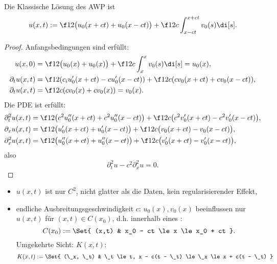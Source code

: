 \begin{st}[Existenz für AWP der Wellengl., D'Alembert'sche Formel, $d = 1$] \label{1.22}
	Die Klassische Lösung des AWP ist
	\[
		u(x,t) := \f 12 \big( u_0(x  + ct) + u_0(x-ct)\big) + \f 1{2c} \int_{x-ct}^{x+ct} v_0(s) \di[s].
	\]
	\begin{proof}
		Anfangsbedingungen sind erfüllt:
		\begin{align*}
			u(x,0) &= \f 12 \big(u_0(x) + u_0(x)\big) + \f 1{2c} \int_x^x v_0(s) \di[s] = u_0(x), \\
			\partial_t u(x,t) &= \f 12 (c_i u_0'(x+ct) -cu_0'(x-ct)) + \f 1{2c}( c v_0(x+ct) + cv_0(x-ct)), \\
			\partial_t u(x,t) &= \f 1{2c} (c v_0(x) + c v_0(x)) = v_0(x).
		\end{align*}
		Die PDE ist erfüllt:
		\begin{align*}
			\partial_t^2 u(x,t) &= \f 12 \big(c^2 u_0''(x+ct) + c^2 u_0''(x-ct)\big) + \f 1{2c} \big( c^2 v_0'(x+ct) - c^2 v_0'(x-ct) \big), \\
			\partial_x u(x,t) &= \f 12 \big(u_0'(x + ct) + u_0'(x-ct)\big) + \f 1{2c} \big( v_0(x+ct) - v_0(x-ct) \big), \\
			\partial_x^2 u(x,t) &= \f 12 \big(u_0''(x+ct) + u_0''(x-ct)\big) + \f 1{2c} \big( v_0'(x+ct) - v_0'(x-ct) \big),
		\end{align*}
		also
		\[
			\partial_t^2 u - c^2 \partial_x^2 u
			= 0.
		\]
	\end{proof}
	\begin{note}
		\begin{itemize}
			\item
				$u(x,t)$ ist nur $C^2$, nicht glatter als die Daten, kein regularisierender Effekt,
			\item
				endliche Ausbreitungsgeschwindigkeit $c$:
				$u_0(x), v_0(x)$ beeinflussen nur $u(x,t)$ für $(x,t) \in C(x_0)$, d.h. innerhalb eines :
				\[
					C(x_0) := \Set{ (x,t) & x_0 - ct \le x \le x_0 + ct }.
				\]
				Umgekehrte Sicht:  $K(x,t)$:
				\[
					K(x,t) := \Set{ (\_x, \_t) & \_t \le t, x - c(t - \_t) \le \_x \le x + c(t - \_t) }
				\]
		\end{itemize}
	\end{note}
\end{st}

